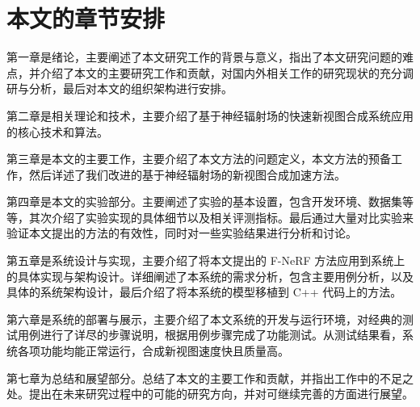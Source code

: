 \section{本文的章节安排}

第一章是绪论，主要阐述了本文研究工作的背景与意义，指出了本文研究问题的难点，并介绍了本文的主要研究工作和贡献，对国内外相关工作的研究现状的充分调研与分析，最后对本文的组织架构进行安排。

第二章是相关理论和技术，主要介绍了基于神经辐射场的快速新视图合成系统应用的核心技术和算法。

第三章是本文的主要工作，主要介绍了本文方法的问题定义，本文方法的预备工作，然后详述了我们改进的基于神经辐射场的新视图合成加速方法。

第四章是本文的实验部分。主要阐述了实验的基本设置，包含开发环境、数据集等等，其次介绍了实验实现的具体细节以及相关评测指标。最后通过大量对比实验来验证本文提出的方法的有效性，同时对一些实验结果进行分析和讨论。

第五章是系统设计与实现，主要介绍了将本文提出的 F-NeRF 方法应用到系统上的具体实现与架构设计。详细阐述了本系统的需求分析，包含主要用例分析，以及具体的系统架构设计，最后介绍了将本系统的模型移植到 C++ 代码上的方法。

第六章是系统的部署与展示，主要介绍了本文系统的开发与运行环境，对经典的测试用例进行了详尽的步骤说明，根据用例步骤完成了功能测试。从测试结果看，系统各项功能均能正常运行，合成新视图速度快且质量高。

第七章为总结和展望部分。总结了本文的主要工作和贡献，并指出工作中的不足之处。提出在未来研究过程中的可能的研究方向，并对可继续完善的方面进行展望。


